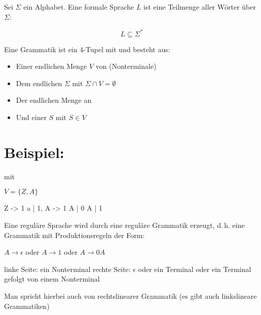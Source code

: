 \documentclass{lehramt-informatik-haupt}
\begin{document}
Sei $\Sigma$ ein Alphabet. Eine formale Sprache $L$ ist eine Teilmenge
aller Wörter über $\Sigma$:

\begin{displaymath}
L \subseteq \Sigma^*
\end{displaymath}

\bigskip

\noindent
Eine Grammatik ist ein 4-Tupel mit \liGrammatik{} und besteht aus:

\begin{itemize}
\item Einer endlichen Menge $V$ von  (Nonterminale)

\item Dem endlichen  $\Sigma$ mit $\Sigma \cap V
= \emptyset$

\item Der endlichen Menge an 

\item Und einer  $S$ mit $S \in V$
\end{itemize}

%

\section{Beispiel:}

\liGrammatik{} mit

$V = \{Z, A\}$


\begin{liProduktionsRegeln}
Z -> 1 a | 1,
A -> 1 A | 0 A | 1
\end{liProduktionsRegeln}

Eine reguläre Sprache wird durch eine reguläre Grammatik erzeugt, d.\,h.
eine Grammatik mit Produktionsregeln der Form:

$A \rightarrow \epsilon$ oder $A \rightarrow 1$ oder $A \rightarrow 0A$

linke Seite: ein Nonterminal rechte Seite: $\epsilon$ oder ein Terminal
oder ein Terminal gefolgt von einem Nonterminal

Man spricht hierbei auch von rechtslinearer Grammatik (es gibt auch
linkslineare Grammatiken)

\end{document}
